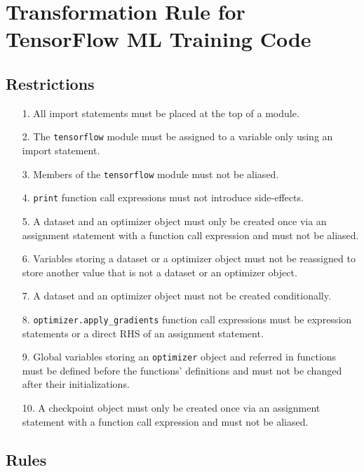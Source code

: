 \newpage
\section{Transformation Rule for TensorFlow ML Training Code}
\subsection{Restrictions}
\begin{itemize}
  \item[1.] All import statements must be placed at the top of a module.  
  \item[2.] The {\tt tensorflow} module must be assigned to a variable only
    using an import statement.
  \item[3.] Members of the {\tt tensorflow} module must not be aliased.
  \item[4.] {\tt print} function call expressions must not introduce
    side-effects.
  \item[5.] A dataset and an optimizer object must only be created once via an
    assignment statement with a function call expression and must not be
    aliased.
  \item[6.] Variables storing a dataset or a optimizer object must not be
    reassigned to store another value that is not a dataset or an optimizer
    object.
  \item[7.] A dataset and an optimizer object must not be created
    conditionally.
  \item[8.] {\tt optimizer.apply\_gradients} function call expressions must be
    expression statements or a direct RHS of an assignment statement.
  \item[9.] Global variables storing an {\tt optimizer} object and referred in
    functions must be defined before the functions' definitions and must not be
    changed after their initializations.
  \item[10.] A checkpoint object must only be created once via an assignment
    statement with a function call expression and must not be aliased. 
\end{itemize}
\subsection{Rules}
